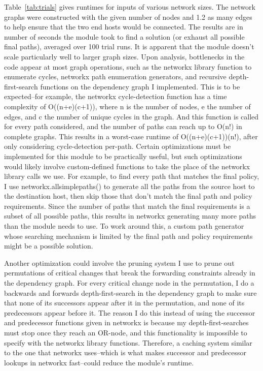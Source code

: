 \documentclass[pageno]{jpaper}
\begin{document}
Table~\ref{tab:trials} gives runtimes for inputs of various network sizes. The network graphs were constructed with the given number of nodes and 1.2 as many edges to help ensure that the two end hosts would be connected. The results are in number of seconds the module took to find a solution (or exhaust all possible final paths), averaged over 100 trial runs. It is apparent that the module doesn't scale particularly well to larger graph sizes. Upon analysis, bottlenecks in the code appear at most graph operations, such as the networkx library function to enumerate cycles, networkx path enumeration generators, and recursive depth-first-search functions on the dependency graph I implemented. This is to be expected--for example, the networkx cycle-detection function has a time complexity of O((n+e)(c+1)), where n is the number of nodes, e the number of edges, and c the number of unique cycles in the graph. And this function is called for every path considered, and the number of paths can reach up to O(n!) in complete graphs. This results in a worst-case runtime of O((n+e)(c+1))(n!), after only considering cycle-detection per-path. Certain optimizations must be implemented for this module to be practically useful, but such optimizations would likely involve custom-defined functions to take the place of the networkx library calls we use. For example, to find every path that matches the final policy, I use networkx.all\textunderscore simple\textunderscore paths() to generate all the paths from the source host to the destination host, then skip those that don't match the final path and policy requirements. Since the number of paths that match the final requirements is a subset of all possible paths, this results in networkx generating many more paths than the module needs to use. To work around this, a custom path generator whose searching mechanism is limited by the final path and policy requirements might be a possible solution.

Another optimization could involve the pruning system I use to prune out permutations of critical changes that break the forwarding constraints already in the dependency graph. For every critical change node in the permutation, I do a backwards and forwards depth-first-search in the dependency graph to make sure that none of its successors appear after it in the permutation, and none of its predecessors appear before it. The reason I do this instead of using the successor and predecessor functions given in networkx is because my depth-first-searches must stop once they reach an OR-node, and this functionality is impossible to specify with the networkx library functions. Therefore, a caching system similar to the one that networkx uses--which is what makes successor and predecessor lookups in networkx fast--could reduce the module's runtime. 
\end{document}
